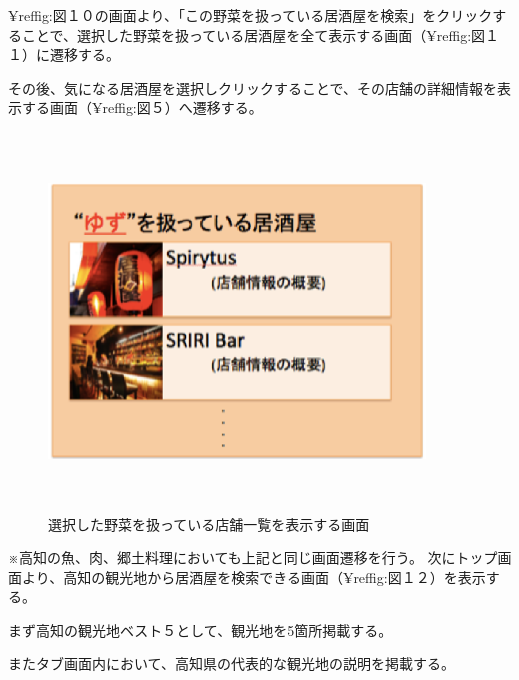 \documentclass[a4j,titlepage]{jarticle}
\begin{document}
¥ref{fig:図１０}の画面より、「この野菜を扱っている居酒屋を検索」をクリックすることで、選択した野菜を扱っている居酒屋を全て表示する画面（¥ref{fig:図１１}）に遷移する。



その後、気になる居酒屋を選択しクリックすることで、その店舗の詳細情報を表示する画面（¥ref{fig:図５}）へ遷移する。
\clearpage
\begin {figure}[!htbp]
    \begin{center}
    \includegraphics [height=10cm, width=10cm]{11.eps}
    \caption {選択した野菜を扱っている店舗一覧を表示する画面}
    \label {fig:11}
    \end{center}
\end {figure}

※高知の魚、肉、郷土料理においても上記と同じ画面遷移を行う。
次にトップ画面より、高知の観光地から居酒屋を検索できる画面（¥ref{fig:図１２}）を表示する。



まず高知の観光地ベスト５として、観光地を5箇所掲載する。



またタブ画面内において、高知県の代表的な観光地の説明を掲載する。
\end{document}
